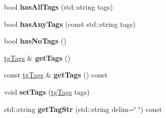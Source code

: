 \begin{DoxyCompactItemize}
\item 
\hypertarget{classtg_taggable_a33b77b1075171b63f673965687b2e844}{bool {\bfseries has\-All\-Tags} (std\-::string tags)}\label{classtg_taggable_a33b77b1075171b63f673965687b2e844}

\item 
\hypertarget{classtg_taggable_af14af28fa98021c4f20a5e8f2ddd5606}{bool {\bfseries has\-Any\-Tags} (const std\-::string tags)}\label{classtg_taggable_af14af28fa98021c4f20a5e8f2ddd5606}

\item 
\hypertarget{classtg_taggable_adff345e116e16420c701a748ff8f995f}{bool {\bfseries has\-No\-Tags} ()}\label{classtg_taggable_adff345e116e16420c701a748ff8f995f}

\item 
\hypertarget{classtg_taggable_acf1d7fa9df8f374f25015c4080902681}{\hyperlink{classtg_tags}{tg\-Tags} \& {\bfseries get\-Tags} ()}\label{classtg_taggable_acf1d7fa9df8f374f25015c4080902681}

\item 
\hypertarget{classtg_taggable_ae70d7d3b45301665bc363b0ed8b9b292}{const \hyperlink{classtg_tags}{tg\-Tags} \& {\bfseries get\-Tags} () const }\label{classtg_taggable_ae70d7d3b45301665bc363b0ed8b9b292}

\item 
\hypertarget{classtg_taggable_a5492888e4e4da4cca6261070b5726adf}{void {\bfseries set\-Tags} (\hyperlink{classtg_tags}{tg\-Tags} tags)}\label{classtg_taggable_a5492888e4e4da4cca6261070b5726adf}

\item 
\hypertarget{classtg_taggable_a346d66b066d2d9eb1eadba01da43749f}{std\-::string {\bfseries get\-Tag\-Str} (std\-::string delim=\char`\"{} \char`\"{}) const }\label{classtg_taggable_a346d66b066d2d9eb1eadba01da43749f}

\end{DoxyCompactItemize}
